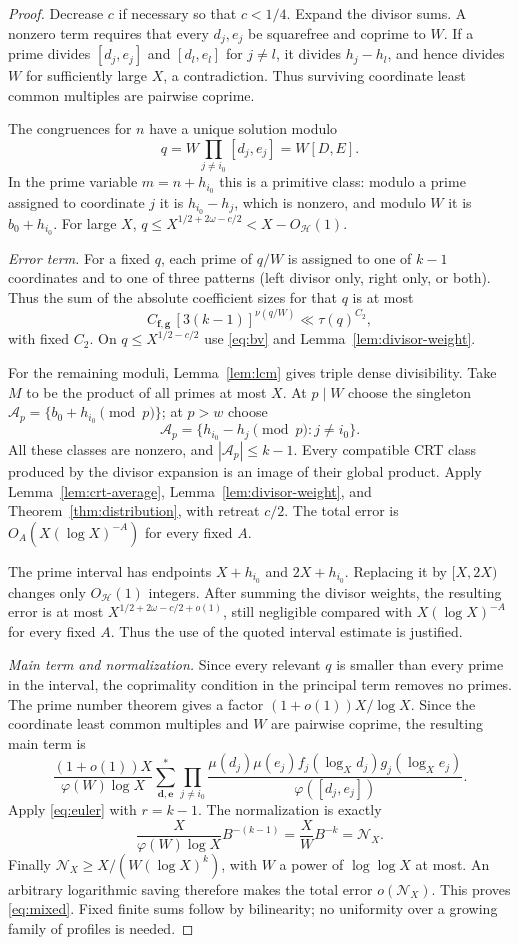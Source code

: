 \documentclass[11pt,a4paper]{article}
\theoremstyle{definition}\newtheorem{definition}[theorem]{Definition}
\theoremstyle{remark}\newtheorem{remark}[theorem]{Remark}
\numberwithin{equation}{section}
\begin{document}
\begin{proof}
Decrease $c$ if necessary so that $c<1/4$. Expand the divisor sums. A nonzero term requires that every $d_j,e_j$ be squarefree and coprime to $W$. If a prime divides $[d_j,e_j]$ and $[d_l,e_l]$ for $j\ne l$, it divides $h_j-h_l$, and hence divides $W$ for sufficiently large $X$, a contradiction. Thus surviving coordinate least common multiples are pairwise coprime.

The congruences for $n$ have a unique solution modulo
\[
 q=W\prod_{j\ne i_0}[d_j,e_j]=W[D,E].
\]
In the prime variable $m=n+h_{i_0}$ this is a primitive class: modulo a prime assigned to coordinate $j$ it is $h_{i_0}-h_j$, which is nonzero, and modulo $W$ it is $b_0+h_{i_0}$. For large $X$, $q\le X^{1/2+2\omega-c/2}<X-O_{\mathcal H}(1)$.

\emph{Error term.} For a fixed $q$, each prime of $q/W$ is assigned to one of $k-1$ coordinates and to one of three patterns (left divisor only, right only, or both). Thus the sum of the absolute coefficient sizes for that $q$ is at most
\[
 C_{\boldsymbol f,\boldsymbol g}\,[3(k-1)]^{\nu(q/W)}\ll\tau(q)^{C_2},
\]
with fixed $C_2$. On $q\le X^{1/2-c/2}$ use \eqref{eq:bv} and Lemma~\ref{lem:divisor-weight}.

For the remaining moduli, Lemma~\ref{lem:lcm} gives triple dense divisibility. Take $M$ to be the product of all primes at most $X$. At $p\mid W$ choose the singleton $\mathcal A_p=\{b_0+h_{i_0}\pmod p\}$; at $p>w$ choose
\[
 \mathcal A_p=\{h_{i_0}-h_j\pmod p:j\ne i_0\}.
\]
All these classes are nonzero, and $|\mathcal A_p|\le k-1$. Every compatible CRT class produced by the divisor expansion is an image of their global product. Apply Lemma~\ref{lem:crt-average}, Lemma~\ref{lem:divisor-weight}, and Theorem~\ref{thm:distribution}, with retreat $c/2$. The total error is $O_A(X(\log X)^{-A})$ for every fixed $A$.

The prime interval has endpoints $X+h_{i_0}$ and $2X+h_{i_0}$. Replacing it by $[X,2X)$ changes only $O_{\mathcal H}(1)$ integers. After summing the divisor weights, the resulting error is at most $X^{1/2+2\omega-c/2+o(1)}$, still negligible compared with $X(\log X)^{-A}$ for every fixed $A$. Thus the use of the quoted interval estimate is justified.

\emph{Main term and normalization.} Since every relevant $q$ is smaller than every prime in the interval, the coprimality condition in the principal term removes no primes. The prime number theorem gives a factor $(1+o(1))X/\log X$. Since the coordinate least common multiples and $W$ are pairwise coprime, the resulting main term is
\[
 \frac{(1+o(1))X}{\varphi(W)\log X}
 \sum_{\boldsymbol d,\boldsymbol e}^{*}
 \prod_{j\ne i_0}
 \frac{\mu(d_j)\mu(e_j)f_j(\log_Xd_j)g_j(\log_Xe_j)}
 {\varphi([d_j,e_j])}.
\]
Apply \eqref{eq:euler} with $r=k-1$. The normalization is exactly
\[
 \frac{X}{\varphi(W)\log X}B^{-(k-1)}
 =\frac XW B^{-k}=\mathcal N_X.
\]
Finally $\mathcal N_X\ge X/(W(\log X)^k)$, with $W$ a power of $\log\log X$ at most. An arbitrary logarithmic saving therefore makes the total error $o(\mathcal N_X)$. This proves \eqref{eq:mixed}. Fixed finite sums follow by bilinearity; no uniformity over a growing family of profiles is needed.
\end{proof}
\end{document}
